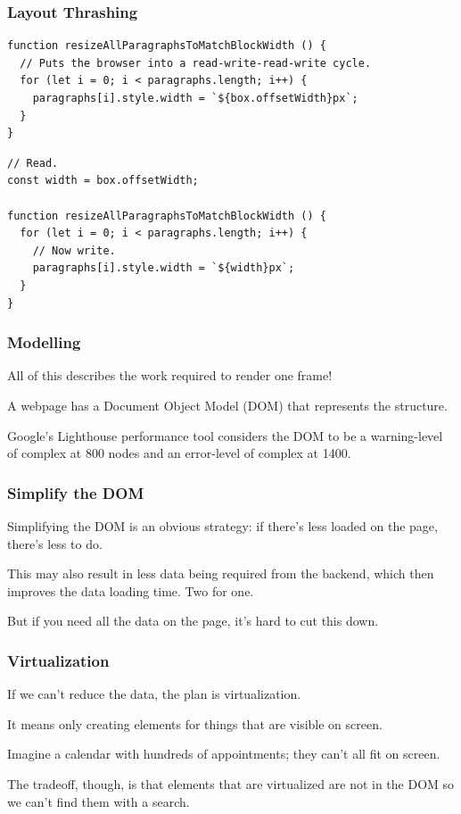 \begin{frame}[fragile]
\frametitle{Layout Thrashing}

\begin{lstlisting}
function resizeAllParagraphsToMatchBlockWidth () {
  // Puts the browser into a read-write-read-write cycle.
  for (let i = 0; i < paragraphs.length; i++) {
    paragraphs[i].style.width = `${box.offsetWidth}px`;
  }
}
\end{lstlisting}



\begin{lstlisting}
// Read.
const width = box.offsetWidth;

function resizeAllParagraphsToMatchBlockWidth () {
  for (let i = 0; i < paragraphs.length; i++) {
    // Now write.
    paragraphs[i].style.width = `${width}px`;
  }
}
\end{lstlisting}

\end{frame}


\begin{frame}
\frametitle{Modelling}
All of this describes the work required to render one frame! 


A webpage has a \alert{Document Object Model (DOM)} that represents the structure.

Google's Lighthouse performance tool considers the DOM to be a warning-level of complex at 800 nodes and an error-level of complex at 1400.

\end{frame}


\begin{frame}
\frametitle{Simplify the DOM}

Simplifying the DOM is an obvious strategy: if there's less loaded on the page, there's less to do. 

This may also result in less data being required from the backend, which then improves the data loading time. Two for one. 

But if you need all the data on the page, it's hard to cut this down.

\end{frame}


\begin{frame}
\frametitle{Virtualization}

If we can't reduce the data, the plan is \alert{virtualization}.

It means only creating elements for things that are visible on screen. 
 
Imagine a calendar with hundreds of appointments; they can't all fit on screen.
 
 The tradeoff, though, is that elements that are virtualized are not in the DOM so we can't find them with a search. 

\end{frame}

